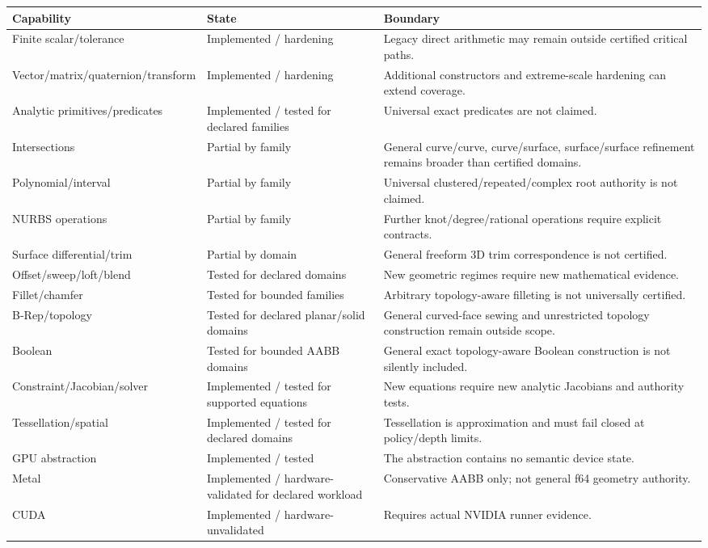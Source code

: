 \documentclass[11pt,a4paper]{report}
\begin{document}
\begin{longtable}{@{}p{}p{}p{}@{}}
\toprule
Capability & State & Boundary \\
\midrule
Finite scalar/tolerance & Implemented / hardening & Legacy direct arithmetic may remain outside certified critical paths. \\
Vector/matrix/quaternion/transform & Implemented / hardening & Additional constructors and extreme-scale hardening can extend coverage. \\
Analytic primitives/predicates & Implemented / tested for declared families & Universal exact predicates are not claimed. \\
Intersections & Partial by family & General curve/curve, curve/surface, surface/surface refinement remains broader than certified domains. \\
Polynomial/interval & Partial by family & Universal clustered/repeated/complex root authority is not claimed. \\
NURBS operations & Partial by family & Further knot/degree/rational operations require explicit contracts. \\
Surface differential/trim & Partial by domain & General freeform 3D trim correspondence is not certified. \\
Offset/sweep/loft/blend & Tested for declared domains & New geometric regimes require new mathematical evidence. \\
Fillet/chamfer & Tested for bounded families & Arbitrary topology-aware filleting is not universally certified. \\
B-Rep/topology & Tested for declared planar/solid domains & General curved-face sewing and unrestricted topology construction remain outside scope. \\
Boolean & Tested for bounded AABB domains & General exact topology-aware Boolean construction is not silently included. \\
Constraint/Jacobian/solver & Implemented / tested for supported equations & New equations require new analytic Jacobians and authority tests. \\
Tessellation/spatial & Implemented / tested for declared domains & Tessellation is approximation and must fail closed at policy/depth limits. \\
GPU abstraction & Implemented / tested & The abstraction contains no semantic device state. \\
Metal & Implemented / hardware-validated for declared workload & Conservative AABB only; not general f64 geometry authority. \\
CUDA & Implemented / hardware-unvalidated & Requires actual NVIDIA runner evidence. \\
\bottomrule
\end{longtable}
\end{document}
